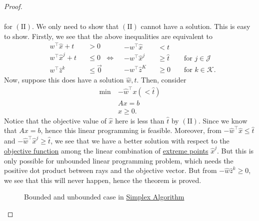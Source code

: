 \begin{proof}
\begin{enumerate}
\[\begin{split}
			      \end{split}
		      \]
		      for \((\mathrm{II})\). We only need to show that \((\mathrm{II})\) cannot have a solution. This is easy to show. Firstly, we see that the above inequalities are equivalent to
		      \[
			      \begin{alignedat}{3}
				      &w^{\top}\hat{x}+t&&>0\\
				      &w^{\top}\hat{x}^j + t&&\leq 0\\
				      &w^{\top}\hat{z}^k &&\leq \vec{0}
			      \end{alignedat}\iff\begin{alignedat}{3}
				      &-w^{\top}\hat{x}&&<t\\
				      &-w^{\top}\hat{x}^j &&\geq \hat{t} &&\text{ for }j\in\mathcal{J}\\
				      &-w^{\top}\hat{z}^K &&\geq 0 &&\text{ for }k\in\mathcal{K}.
			      \end{alignedat}
		      \]
		      Now, suppose this does have a solution \(\hat{w}, \hat{t}\). Then, consider
		      \[
			      \begin{aligned}
				      \min~ & -\hat{w}^{\top}x(<\hat{t}) \\
				            & Ax = b                     \\
				            & x\geq 0.
			      \end{aligned}
		      \]
		      Notice that the objective value of \(\hat{x}\) here is less than \(\hat{t}\) by \((\mathrm{II})\). Since we know that \(Ax = b\), hence this linear programming is feasible. Moreover, from \(-\hat{w}^{\top}\hat{x}\leq \hat{t}\) and \(-\hat{w}^{\top}\hat{x}^j\geq \hat{t}\), we see that we have a better solution with respect to the \hyperref[def:objective-function]{objective function} among the linear combination of \hyperref[def:extreme-point]{extreme points} \(\hat{x}^j\). But this is only possible for unbounded linear programming problem, which needs the positive dot product between rays and the objective vector. But from \(-\hat{w}\hat{z}^k\geq 0\), we see that this will never happen, hence the theorem is proved.
		      \begin{figure}[H]
			      \centering
			      \caption{Bounded and unbounded case in \hyperref[algo:simplex-algorithm]{Simplex Algorithm}}
			      \label{fig:representation-theorem}
		      \end{figure}
	\end{enumerate}
\end{proof}

